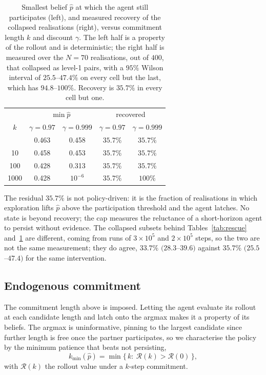 \documentclass[aps,pre,twocolumn,superscriptaddress,floatfix,longbibliography]{revtex4-2}
\begin{document}
\begin{table}[t]
\caption{Smallest belief $\hat p$ at which the agent still participates
(left), and measured recovery of the collapsed realisations (right), versus
commitment length $k$ and discount $\gamma$. The left half is a property of
the rollout and is deterministic; the right half is measured over the $N=70$
realisations, out of $400$, that collapsed as level-1 pairs, with a $95\%$
Wilson interval of $25.5$--$47.4\%$ on every cell but the last, which has
$94.8$--$100\%$. Recovery is $35.7\%$ in every cell
but one.}
\label{tab:noreturn}
\begin{ruledtabular}
\begin{tabular}{ccccc}
 & \multicolumn{2}{c}{$\min \hat p$} & \multicolumn{2}{c}{recovered} \\
$k$ & $\gamma=0.97$ & $\gamma=0.999$ & $\gamma=0.97$ & $\gamma=0.999$ \\
\colrule
1    & 0.463 & 0.458 & $35.7\%$ & $35.7\%$ \\
10   & 0.458 & 0.453 & $35.7\%$ & $35.7\%$ \\
100  & 0.428 & 0.313 & $35.7\%$ & $35.7\%$ \\
1000 & 0.428 & $10^{-6}$ & $35.7\%$ & $100\%$ \\
\end{tabular}
\end{ruledtabular}
\end{table}

The residual $35.7\%$ is not policy-driven: it is the
fraction of realisations
in which exploration lifts $\hat p$ above the participation threshold and the
agent latches. No state is beyond recovery; the cap measures the reluctance of a
short-horizon agent to persist without evidence. The collapsed subsets
behind Tables~\ref{tab:rescue} and~\ref{tab:noreturn} are different, coming from
runs of $3\times10^{5}$ and $2\times10^{5}$ steps, so the two are not the same
measurement; they do agree, $33.7\%$ $(28.3$--$39.6)$ against $35.7\%$
$(25.5$--$47.4)$ for the same intervention.

\subsection{Endogenous commitment}

The commitment length above is imposed. Letting the agent evaluate its rollout
at each candidate length and latch onto the argmax makes it a property of its
beliefs. The argmax is uninformative, pinning to the largest candidate since
further length is free once the partner participates, so we characterise the
policy by the minimum patience that beats not persisting,
\begin{equation}
  k_{\min}(\hat p) = \min\{\,k:\ \mathcal{R}(k) > \mathcal{R}(0)\,\},
\end{equation}
with $\mathcal{R}(k)$ the rollout value under a $k$-step commitment.
\end{document}
